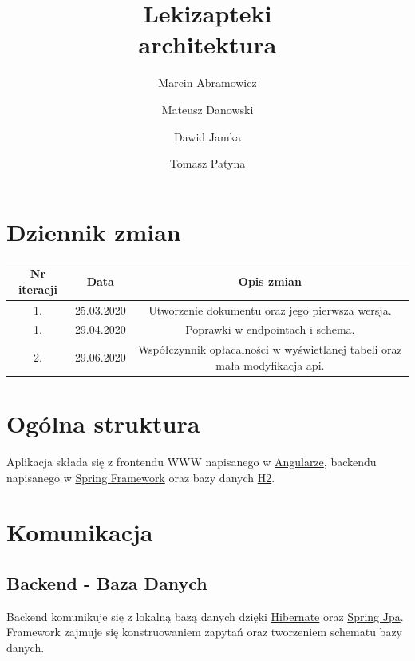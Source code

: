 \documentclass{article}
\title{
Lekizapteki\\
\large architektura}
\author{Marcin Abramowicz \and Mateusz Danowski \and Dawid Jamka \and Tomasz Patyna}
\begin{document}
  \maketitle

  \section{Dziennik zmian}
    \begin{tabular}{|c|c|c|}
      Nr iteracji & Data & Opis zmian \\
      \hline
      1. & 25.03.2020 & Utworzenie dokumentu oraz jego pierwsza wersja. \\
      \hline
      1. & 29.04.2020 & Poprawki w endpointach i schema. \\
      \hline
      2. & 29.06.2020 & Współczynnik opłacalności w wyświetlanej tabeli oraz mała modyfikacja api. \\
    \end{tabular}

  \section{Ogólna struktura}
    Aplikacja składa się z frontendu WWW napisanego w
    \href{https://angular.io}{Angularze}, backendu napisanego w
    \href{https://spring.io}{Spring Framework} oraz bazy danych
    \href {https://www.h2database.com/html/main.html}{H2}.

  \section{Komunikacja}
    \subsection{Backend - Baza Danych}
    Backend komunikuje się z lokalną bazą danych dzięki
    \href{https://hibernate.org}{Hibernate} oraz
    \href{https://spring.io/projects/spring-data-jpa} {Spring Jpa}.
    Framework zajmuje się konstruowaniem zapytań oraz tworzeniem schematu bazy danych.
\end{document}
